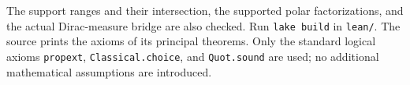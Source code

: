 \documentclass[11pt]{article}
\begin{document}
The support ranges and their intersection, the supported polar factorizations, and the actual Dirac-measure bridge are also checked. Run \texttt{lake build} in \texttt{lean/}. The source prints the axioms of its principal theorems. Only the standard logical axioms \texttt{propext}, \texttt{Classical.choice}, and \texttt{Quot.sound} are used; no additional mathematical assumptions are introduced.
\end{document}
